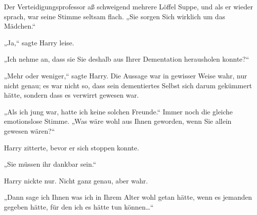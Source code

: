 Der Verteidigungsprofessor aß schweigend mehrere Löffel Suppe, und als er wieder sprach, war seine Stimme seltsam flach. „Sie sorgen Sich wirklich um das Mädchen.“

„Ja,“ sagte Harry leise.

„Ich nehme an, dass sie Sie deshalb aus Ihrer Dementation herausholen konnte?“

„Mehr oder weniger,“ sagte Harry. Die Aussage war in gewisser Weise wahr, nur nicht genau; es war nicht so, dass sein dementiertes Selbst sich darum gekümmert hätte, sondern dass es verwirrt gewesen war.

„Als ich jung war, hatte ich keine solchen Freunde.“ Immer noch die gleiche emotionslose Stimme. „Was wäre wohl aus Ihnen geworden, wenn Sie allein gewesen wären?“

Harry zitterte, bevor er sich stoppen konnte.

„Sie müssen ihr dankbar sein.“

Harry nickte nur. Nicht ganz genau, aber wahr.

„Dann sage ich Ihnen was ich in Ihrem Alter wohl getan hätte, wenn es jemanden gegeben hätte, für den ich es hätte tun können…“

